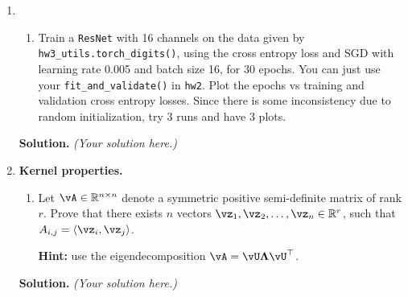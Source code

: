 \documentclass{article}
\theoremstyle{definition}
\theoremstyle{remark}
\newenvironment{Q}
{%
\clearpage
\item
}
{%
\phantom{s}
\bigskip
\textbf{Solution.}
\emph{(Your solution here.)}
}
\begin{document}
\begin{enumerate}
\begin{Q}
\begin{enumerate}
        \item Train a \texttt{ResNet} with 16 channels on the data given by \texttt{hw3\_utils.torch\_digits()}, using the cross entropy loss and SGD with learning rate 0.005 and batch size 16, for 30 epochs. You can just use your \texttt{fit\_and\_validate()} in \texttt{hw2}. Plot the epochs vs training and validation cross entropy losses. Since there is some inconsistency due to random initialization, try 3 runs and have 3 plots.
    \end{enumerate}
\end{Q}

%
%
%
%

\begin{Q}
    \textbf{Kernel properties.}

    \begin{enumerate}
        \item Let $\vA\in \mathbb{R}^{n\times n}$ denote a symmetric positive semi-definite matrix of rank $r$. Prove that there exists $n$ vectors $\vz_1,\vz_2,\ldots,\vz_n\in \mathbb{R}^r$, such that $A_{i,j}=\langle \vz_i,\vz_j\rangle$.

        \textbf{Hint:} use the eigendecomposition $\vA=\vU\boldsymbol{\Lambda}\vU^\top$.


\end{enumerate}
\end{Q}
\end{enumerate}
\end{document}
